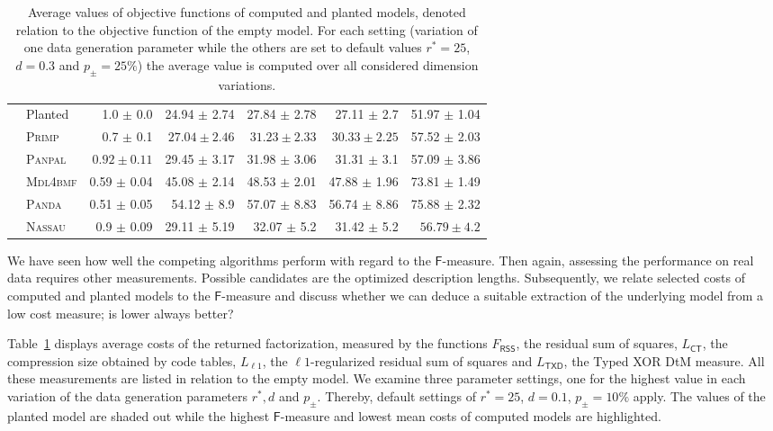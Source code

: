 \begin{table}
\begin{adjustbox}{max width=\textwidth}
\begin{tabular}{clrrrrr}
\rowcolor{black!10}
 \multirow{6}{*}{\cellcolor{white}\rotatebox{90}{ $d=0.3$ }  } 
&Planted &  1.0 $\pm$ 0.0  & 24.94 $\pm$ 2.74 & 27.84 $\pm$ 2.78 & 27.11 $\pm$ 2.7 & 51.97 $\pm$ 1.04\\
 & \textsc{Primp} & 0.7 $\pm$ 0.1  & $\mathbf{27.04\pm2.46}$ & $\mathbf{31.23\pm2.33}$ & $\mathbf{30.33\pm2.25}$ & 57.52 $\pm$ 2.03\\
 & \textsc{Panpal}  & $\mathbf{0.92\pm0.11}$ & 29.45 $\pm$ 3.17 & 31.98 $\pm$ 3.06 & 31.31 $\pm$ 3.1 & 57.09 $\pm$ 3.86\\
 & \textsc{Mdl4bmf} & 0.59 $\pm$ 0.04 & 45.08 $\pm$ 2.14 & 48.53 $\pm$ 2.01 & 47.88 $\pm$ 1.96 & 73.81 $\pm$ 1.49\\
 & \textsc{Panda} & 0.51 $\pm$ 0.05 & 54.12 $\pm$ 8.9 & 57.07 $\pm$ 8.83 & 56.74 $\pm$ 8.86 & 75.88 $\pm$ 2.32\\
 & \textsc{Nassau} & 0.9 $\pm$ 0.09 & 29.11 $\pm$ 5.19 & 32.07 $\pm$ 5.2 & 31.42 $\pm$ 5.2 & $\mathbf{56.79\pm4.2}$\\ 
 \bottomrule
\end{tabular}
\end{adjustbox}
\caption{Average values of objective functions of computed and planted models, denoted relation to the objective function of the empty model. For each setting (variation of one data generation parameter while the others are set to default values $r^*=25$, $d=0.3$ and $p_\pm=25\%$) the average value is computed over all considered dimension variations.}
\label{tbl:avgCosts}
\end{table}

We have seen how well the competing algorithms perform with regard to the $\mathsf{F}$-measure. Then again, assessing the performance on real data requires other measurements. Possible candidates are the optimized description lengths. Subsequently, we relate selected costs of computed and planted models to the $\mathsf{F}$-measure and discuss whether we can deduce a suitable extraction of the underlying model from a low cost measure; is lower always better? 

Table~\ref{tbl:avgCosts} displays average costs of the returned factorization, measured by the functions $F_{\mathsf{RSS}}$, the residual sum of squares, $L_{\mathsf{CT}}$, the compression size obtained by code tables, $L_{\ell 1}$, the $\ell 1$-regularized residual sum of squares and $L_{\mathsf{TXD}}$, the Typed XOR DtM measure. All these measurements are listed in relation to the empty model. We examine three parameter settings, one for the highest value in each variation of the data generation parameters $r^*, d$ and $p_\pm$. Thereby, default settings of $r^*=25$, $d=0.1$, $p_\pm=10\%$ apply. The values of the planted model are shaded out while the highest $\mathsf{F}$-measure and lowest mean costs of computed models are highlighted. 

